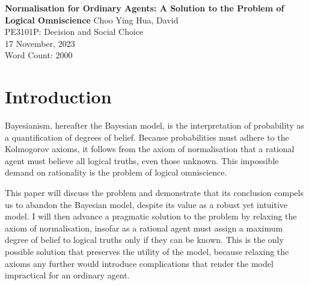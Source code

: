 \documentclass[12pt]{article}
\renewcommand{\maketitle}{%
    \begin{titlepage}
        \begin{center}
            \vfill
            \vspace*{\baselineskip}
            \vfill
            \textbf{Normalisation for Ordinary Agents: A Solution to the Problem of Logical Omniscience}
            \vfill
            Choo Ying Hua, David\\
            PE3101P: Decision and Social Choice\\
            17 November, 2023\\
            Word Count: 2000
            \vfill
        \end{center}
    \end{titlepage}
    }
\begin{document}
\maketitle
\section{Introduction}
Bayesianism, hereafter the Bayesian model, is the interpretation of probability as a quantification of degrees of belief. Because probabilities must adhere to the Kolmogorov axioms, it follows from the axiom of normalisation that a rational agent must believe all logical truths, even those unknown. This impossible demand on rationality is the problem of logical omniscience.

This paper will discuss the problem and demonstrate that its conclusion compels us to abandon the Bayesian model, despite its value as a robust yet intuitive model. I will then advance a pragmatic solution to the problem by relaxing the axiom of normalisation, insofar as a rational agent must assign a maximum degree of belief to logical truths only if they can be known. This is the only possible solution that preserves the utility of the model, because relaxing the axioms any further would introduce complications that render the model impractical for an ordinary agent.
\end{document}
